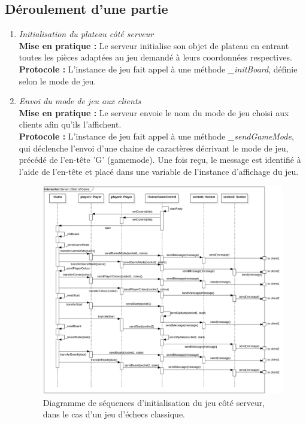 \documentclass[10pt, a4paper]{article}
\begin{document}
\subsection{Déroulement d'une partie}
\begin{enumerate}

\item \textit{Initialisation du plateau côté serveur}\\
\textbf{Mise en pratique :} Le serveur initialise son objet de plateau en entrant toutes les pièces adaptées au jeu demandé à leurs coordonnées respectives.\\
\textbf{Protocole :} L'instance de jeu fait appel à une méthode \textit{\_initBoard}, définie selon le mode de jeu.

\item \textit{Envoi du mode de jeu aux clients}\\
\textbf{Mise en pratique :} Le serveur envoie le nom du mode de jeu choisi aux clients afin qu'ils l'affichent.\\
\textbf{Protocole :} L'instance de jeu fait appel à une méthode \textit{\_sendGameMode}, qui déclenche l'envoi d'une chaine de caractères décrivant le mode de jeu, précédé de l'en-tête 'G' (gamemode). Une fois reçu, le message est identifié à l'aide de l'en-tête et placé dans une variable de l'instance d'affichage du jeu.

\begin{figure} [ht]
\centering
\includegraphics[scale=0.40]{Sequence_Server_GameStart.png}
\caption{Diagramme de séquences d'initialisation du jeu côté serveur, dans le cas d'un jeu d'échecs classique.}
\end{figure}


\end{enumerate}
\end{document}
